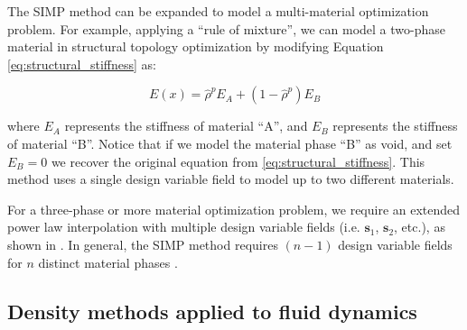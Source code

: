 
The SIMP method can be expanded to model a multi-material optimization problem. For example, applying a ``rule of mixture'', we can model a two-phase material in structural topology optimization by modifying Equation \ref{eq:structural_stiffness} as:

\begin{equation}
	\label{eq:two_phase_stiffness}
	E\left(x\right) = \hat{\rho} ^ p E_{A} + \left( 1 - \hat{\rho} ^ p \right) E_{B}
\end{equation}

where $E_{A}$ represents the stiffness of material ``A'', and $E_{B}$ represents the stiffness of material ``B''. Notice that if we model the material phase ``B'' as void, and set $E_{B}=0$ we recover the original equation from \ref{eq:structural_stiffness}. This method uses a single design variable field to model up to two different materials.

For a three-phase or more material optimization problem, we require an extended power law interpolation with multiple design variable fields (i.e. $\mathbf{s}_{1}$, $\mathbf{s}_{2}$, etc.), as shown in \citep{WW:04c,PS:14}. In general, the SIMP method requires $\left( n - 1 \right)$ design variable fields for $n$ distinct material phases \citep{WW:04c}.


\subsection{Density methods applied to fluid dynamics}
\label{sec:intro_density_fluid_dynamics}

